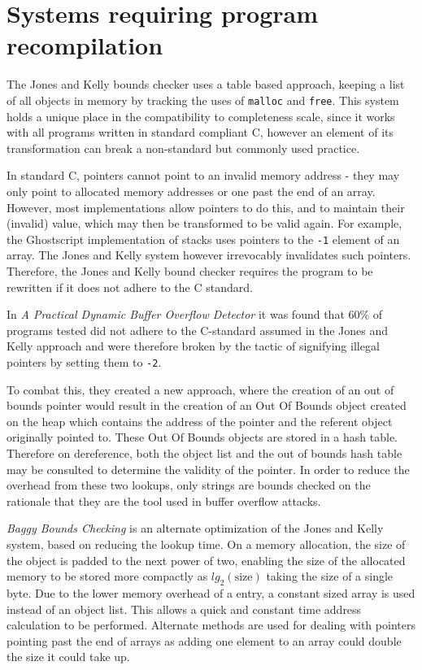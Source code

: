 \section{Systems requiring program recompilation}

The Jones and Kelly bounds checker \cite{jones1997backwards} uses a table based approach, keeping a list of all objects in memory by tracking the uses of \verb!malloc! and \verb!free!.
This system holds a unique place in the compatibility to completeness scale, since it works with all programs written in standard compliant C, however an element of its transformation can break a non-standard but commonly used practice.

In standard C, pointers cannot point to an invalid memory address - they may only point to allocated memory addresses or one past the end of an array.
However, most implementations allow pointers to do this, and to maintain their (invalid) value, which may then be transformed to be valid again.
For example, the Ghostscript implementation of stacks uses pointers to the \verb!-1! element of an array.
The Jones and Kelly system however irrevocably invalidates such pointers.
Therefore, the Jones and Kelly bound checker requires the program to be rewritten if it does not adhere to the C standard.

In \textit{A Practical Dynamic Buffer Overflow Detector} \cite{ruwase2004practical} it was found that 60\% of programs tested did not adhere to the C-standard assumed in the Jones and Kelly approach and were therefore broken by the tactic of signifying illegal pointers by setting them to \verb!-2!.

To combat this, they created a new approach, where the creation of an out of bounds pointer would result in the creation of an Out Of Bounds object created on the heap which contains the address of the pointer and the referent object originally pointed to.
These Out Of Bounds objects are stored in a hash table.
Therefore on dereference, both the object list and the out of bounds hash table may be consulted to determine the validity of the pointer.
In order to reduce the overhead from these two lookups, only strings are bounds checked on the rationale that they are the tool used in buffer overflow attacks.

\textit{Baggy Bounds Checking} \cite{akritidis2009baggy} is an alternate optimization of the Jones and Kelly system, based on reducing the lookup time.
On a memory allocation, the size of the object is padded to the next power of two, enabling the size of the allocated memory to be stored more compactly as $lg_2(\mbox{size})$ taking the size of a single byte.
Due to the lower memory overhead of a entry, a constant sized array is used instead of an object list.
This allows a quick and constant time address calculation to be performed.
Alternate methods are used for dealing with pointers pointing past the end of arrays as adding one element to an array could double the size it could take up.

